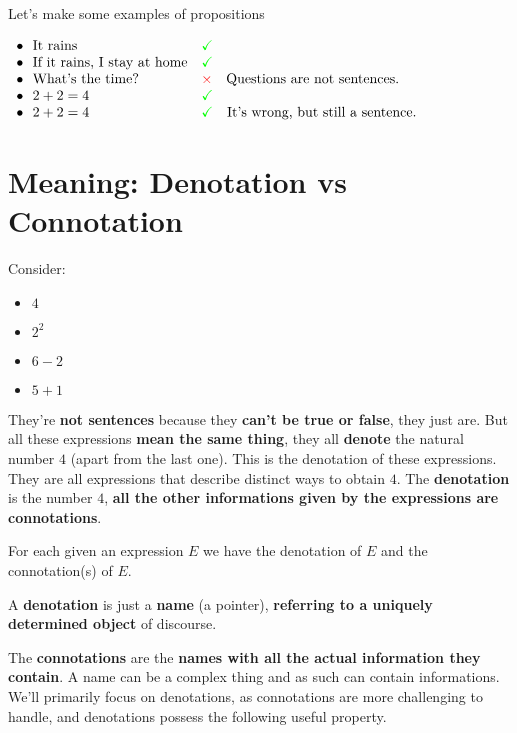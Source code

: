 	\begin{example} Let's make some examples of propositions \vspace{0.3cm}

$
\begin{array}{l l}
\bullet \ \ \text{It rains} & {\color{green} \checkmark} \\
\bullet \ \ \text{If it rains, I stay at home} & {\color{green} \checkmark} \\
\bullet \ \ \text{What's the time?} & {\color{red} \times} \quad \text{Questions are not sentences.} \\
\bullet \ \ 2 + 2 = 4 & {\color{green} \checkmark} \\
\bullet \ \ 2 + 2 = 4 & {\color{green} \checkmark} \quad \text{It's wrong, but still a sentence.}
\end{array}
$
	\end{example}

	\section{Meaning: Denotation vs Connotation}
	Consider:
	\begin{itemize}
		\item $4$
		\item $2^2$
		\item $6-2$
		\item $5+1$
	\end{itemize}

	They're \textbf{not sentences} because they \textbf{can't be true or false}, they just are.
	But all these expressions \textbf{mean the same thing}, they all \textbf{denote} the natural number $4$ (apart from the last one). This is the denotation of these expressions.
	They are all expressions that describe distinct ways to obtain $4$. The \textbf{denotation} is the number $4$, \textbf{all the other informations given by the expressions are connotations}.

	For each given an expression $E$ we have the denotation of $E$ and the connotation(s) of $E$.

	A \textbf{denotation} is just a \textbf{name} (a pointer), \textbf{referring to a uniquely determined object} of discourse.

	The \textbf{connotations} are the \textbf{names with all the actual information they contain}. A name can be a complex thing and as such can contain informations. \\

	We'll primarily focus on denotations, as connotations are more challenging to handle, and denotations 	possess the following useful property.

